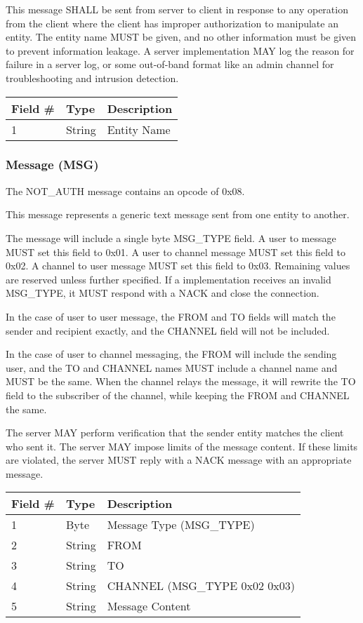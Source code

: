 \documentclass[12pt]{article}
\begin{document}
This message SHALL be sent from server to client in response to any operation
from the client where the client has improper authorization to manipulate an
entity. The entity name MUST be given, and no other information must be given to
prevent information leakage. A server implementation MAY log the reason for
failure in a server log, or some out-of-band format like an admin channel for
troubleshooting and intrusion detection.

\begin{table}[ht]
\begin{tabular} {|l|l|l|}
    \hline 
    Field \# & Type & Description \\
    \hline
    1 & String & Entity Name \\
    \hline
\end{tabular}
\end{table}

\subsubsection{Message (MSG)}
The NOT\_AUTH message contains an opcode of 0x08.

This message represents a generic text message sent from one entity to another.

The message will include a single byte MSG\_TYPE field. A user to message MUST
set this field to 0x01. A user to channel message MUST set this field to 0x02. A
channel to user message MUST set this field to 0x03. Remaining values are
reserved unless further specified. If a implementation receives an invalid
MSG\_TYPE, it MUST respond with a NACK and close the connection.

In the case of user to user message, the FROM and TO fields will match the
sender and recipient exactly, and the CHANNEL field will not be included. 

In the case of user to channel messaging, the FROM will include the sending user, and the TO
and CHANNEL names MUST include a channel name and MUST be the same. When the
channel relays the message, it will rewrite the TO field to the subscriber of
the channel, while keeping the FROM and CHANNEL the same.

The server MAY perform verification that the sender entity matches the client
who sent it. The server MAY impose limits of the message content. If these
limits are violated, the server MUST reply with a NACK message with an
appropriate message.

\begin{table}[ht]
\begin{tabular} {|l|l|l|}
    \hline 
    Field \# & Type & Description \\
    \hline
    1 & Byte & Message Type (MSG\_TYPE) \\
    2 & String & FROM \\
    3 & String & TO \\
    4 & String & CHANNEL (MSG\_TYPE 0x02 0x03) \\
    5 & String & Message Content \\
    \hline
\end{tabular}
\end{table}
\end{document}
